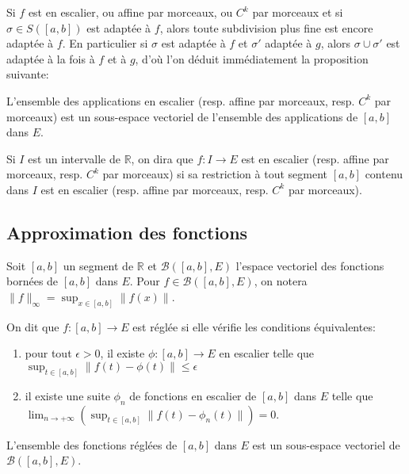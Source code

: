 \begin{rem}
Si $f$ est en escalier, ou affine par morceaux, ou $C^k$ par morceaux et si $\sigma \in S([a,b])$ est adaptée à $f$, alors toute subdivision plus fine est encore adaptée à $f$. En particulier si $\sigma$ est adaptée à $f$ et $\sigma'$ adaptée à $g$, alors $\sigma \cup \sigma'$ est adaptée à la fois à $f$ et à $g$, d'où l'on déduit immédiatement la proposition suivante:
\end{rem}

\begin{prop}
L'ensemble des applications en escalier (resp. affine par morceaux, resp. $C^k$ par morceaux) est un sous-espace vectoriel de l'ensemble des applications de $[a,b]$ dans $E$.
\end{prop}

\begin{de}[Extension]
Si $I$ est un intervalle de $\mathbb{R}$, on dira que $f : I \to E$ est en escalier (resp. affine par morceaux, resp. $C^k$ par morceaux) si sa restriction à tout segment $[a,b]$ contenu dans $I$ est en escalier (resp. affine par morceaux, resp. $C^k$ par morceaux).
\end{de}

\subsection{Approximation des fonctions}

Soit $[a,b]$ un segment de $\mathbb{R}$ et $\mathcal{B}([a,b],E)$ l'espace vectoriel des fonctions bornées de $[a,b]$ dans $E$. Pour $f \in \mathcal{B}([a,b],E)$, on notera $\|f\|_\infty = \sup_{x \in [a,b]} \|f(x)\|$.

\begin{de}
On dit que $f : [a,b] \to E$ est réglée si elle vérifie les conditions équivalentes:
\begin{enumerate}
  \item pour tout $\epsilon > 0$, il existe $\phi : [a,b] \to E$ en escalier telle que $\sup_{t \in [a,b]} \|f(t) - \phi(t)\| \leq \epsilon$
  \item il existe une suite $\phi_n$ de fonctions en escalier de $[a,b]$ dans $E$ telle que $\lim_{n \to +\infty} \left(\sup_{t \in [a,b]} \|f(t) - \phi_n(t)\|\right) = 0$.
\end{enumerate}
L'ensemble des fonctions réglées de $[a,b]$ dans $E$ est un sous-espace vectoriel de $\mathcal{B}([a,b],E)$.
\end{de}

